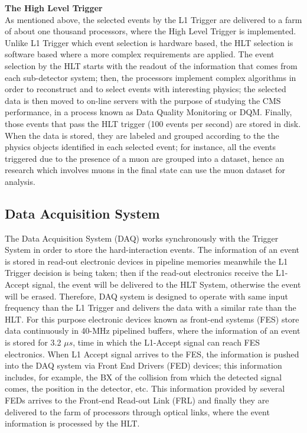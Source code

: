\textbf{The High Level Trigger}\\

\noindent As mentioned above, the selected events by the L1 Trigger are delivered 
to a farm of about one thousand processors, where the High Level Trigger is implemented. 
Unlike L1 Trigger which event selection is hardware based, the HLT selection is 
software based where a more complex requirements are applied. The event selection by the HLT starts 
with the readout of the information that comes from each sub-detector system;
then, the processors implement complex algorithms in order to reconstruct
and to select events with interesting physics; the selected data is then moved
to on-line servers with the purpose of studying the CMS performance, in a process 
known as Data Quality Monitoring or DQM. Finally, those events that pass the HLT trigger (100 events per second) 
are stored in disk. When the data is stored, they are labeled and grouped 
according to the the physics objects identified in each selected event; for instance, 
all the events triggered due to the presence of a muon are grouped into a dataset, hence 
an research which involves muons in the final state can use the muon dataset for analysis. 






\subsection{Data Acquisition System}
\label{subsec:Trigger}

\noindent The Data Acquisition System (DAQ) works synchronously with the Trigger System
in order to store the hard-interaction events. The information of an event 
is stored in read-out electronic devices in pipeline memories meanwhile 
the L1 Trigger decision is being taken; then if the read-out electronics
receive the L1-Accept signal, the event will be delivered to the HLT System, otherwise
the event will be erased. Therefore, DAQ system is designed to operate with 
same input frequency than the L1 Trigger and delivers the data with a similar 
rate than the HLT. For this purpose electronic devices known as 
front-end systems (FES) store data continuously in 40-MHz pipelined 
buffers, where the information of an event is stored 
for 3.2 $\mu s$, time in which the L1-Accept signal can reach FES electronics. When 
L1 Accept signal arrives to the FES, the information is pushed into the DAQ system 
via Front End Drivers (FED) devices; this information includes, for example, the BX 
of the collision from which the detected signal comes, the position
in the detector, etc. This information provided by several FEDs arrives to the 
Front-end Read-out Link (FRL) and finally they are delivered to the 
farm of processors through optical links, where the event information 
is processed by the HLT. 

